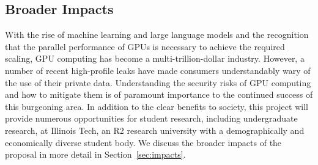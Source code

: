 \subsection{Broader Impacts}

With the rise of machine learning and large language models and the recognition that the parallel performance of GPUs is necessary to achieve the required scaling, GPU computing has become a multi-trillion-dollar industry.
%
However, a number of recent high-profile leaks have made consumers understandably wary of the use of their private data.
%
Understanding the security risks of GPU computing and how to mitigate them is of paramount importance to the continued success of this burgeoning area.
%
In addition to the clear benefits to society, this project will provide numerous opportunities for student research, including undergraduate research, at Illinois Tech, an R2 research university with a demographically and economically diverse student body.
%
We discuss the broader impacts of the proposal in more detail in Section~\ref{sec:impacts}.
